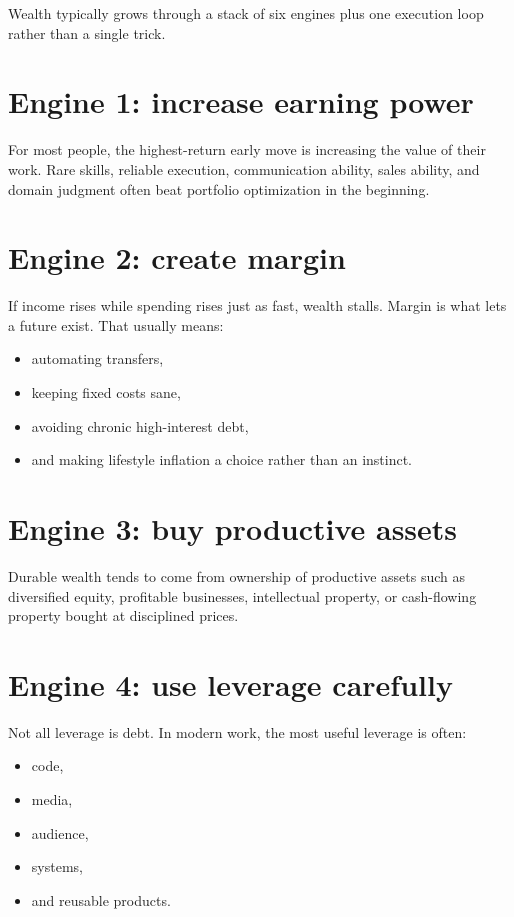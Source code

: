 \documentclass[11pt,openany]{book}
\begin{document}
Wealth typically grows through a stack of six engines plus one execution loop rather than a single trick.

\section{Engine 1: increase earning power}

For most people, the highest-return early move is increasing the value of their work. Rare skills, reliable execution, communication ability, sales ability, and domain judgment often beat portfolio optimization in the beginning.

\section{Engine 2: create margin}

If income rises while spending rises just as fast, wealth stalls. Margin is what lets a future exist. That usually means:

\begin{itemize}
  \item automating transfers,
  \item keeping fixed costs sane,
  \item avoiding chronic high-interest debt,
  \item and making lifestyle inflation a choice rather than an instinct.
\end{itemize}

\section{Engine 3: buy productive assets}

Durable wealth tends to come from ownership of productive assets such as diversified equity, profitable businesses, intellectual property, or cash-flowing property bought at disciplined prices.

\section{Engine 4: use leverage carefully}

Not all leverage is debt. In modern work, the most useful leverage is often:

\begin{itemize}
  \item code,
  \item media,
  \item audience,
  \item systems,
  \item and reusable products.
\end{itemize}
\end{document}
